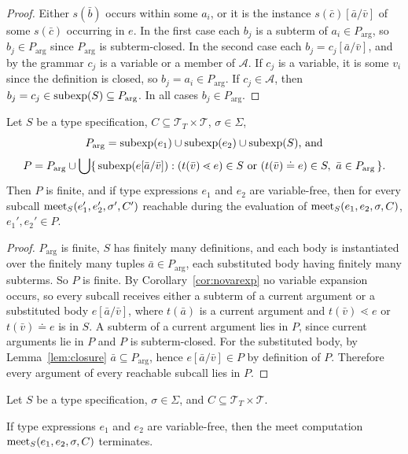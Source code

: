 \documentclass[doc]{subfiles}
\begin{document}
\begin{proof}
	Either $s(\bar b)$ occurs within some $a_i$, or it is the instance $s(\bar c)[\bar a/\bar v]$
	of some $s(\bar c)$ occurring in $e$.
	In the first case each $b_j$ is a subterm of $a_i \in P_{\mathrm{arg}}$, so $b_j \in P_{\mathrm{arg}}$
	since $P_{\mathrm{arg}}$ is subterm-closed.
	In the second case each $b_j = c_j[\bar a/\bar v]$, and by the grammar $c_j$ is a variable or a member of $\mathcal A$.
	If $c_j$ is a variable, it is some $v_i$ since the definition is closed, so $b_j = a_i \in P_{\mathrm{arg}}$.
	If $c_j \in \mathcal A$, then $b_j = c_j \in \mathrm{subexp}(S) \subseteq P_{\mathrm{arg}}$.
	In all cases $b_j \in P_{\mathrm{arg}}$.
\end{proof}

\begin{lemma}\label{lem:vfree-pool}
	Let $S$ be a type specification, $C \subseteq \mathcal{T}_T \times \mathcal{T}$, $\sigma \in \Sigma$,
	\[
		P_{\mathrm{arg}} = \mathrm{subexp}(e_1) \cup \mathrm{subexp}(e_2) \cup \mathrm{subexp}(S)\text{, and}
	\]
	\[
		P = P_{\mathrm{arg}} \cup \bigcup \{\, \mathrm{subexp}(e[\bar a/\bar v]) :
		(t(\bar v) \lessdot e) \in S \text{ or } (t(\bar v) \doteq e) \in S,\ \bar a \in P_{\mathrm{arg}} \,\}.
	\]
	Then $P$ is finite, and if type expressions $e_1$ and $e_2$ are variable-free,
	then for every subcall $\mathrm{meet}_S(e_1',e_2',\sigma',C')$
	reachable during the evaluation of $\mathrm{meet}_S(e_1,e_2,\sigma,C)$,
	$e_1',e_2' \in P$.
\end{lemma}

\begin{proof}
	$P_{\mathrm{arg}}$ is finite, $S$ has finitely many definitions,
	and each body is instantiated over the finitely many tuples $\bar a \in P_{\mathrm{arg}}$,
	each substituted body having finitely many subterms. So $P$ is finite.
	By Corollary~\ref{cor:novarexp} no variable expansion occurs, so every subcall receives
	either a subterm of a current argument or a substituted body $e[\bar a/\bar v]$,
	where $t(\bar a)$ is a current argument and $t(\bar v) \lessdot e$ or $t(\bar v) \doteq e$ is in $S$.
	A subterm of a current argument lies in $P$, since current arguments lie in $P$ and $P$ is subterm-closed.
	For the substituted body, by Lemma~\ref{lem:closure} $\bar a \subseteq P_{\mathrm{arg}}$,
	hence $e[\bar a/\bar v] \in P$ by definition of $P$.
	Therefore every argument of every reachable subcall lies in $P$.
\end{proof}

\begin{lemma}\label{lem:vfree-term}
	Let $S$ be a type specification,
	$\sigma \in \Sigma$,
	and $C \subseteq \mathcal{T}_T \times \mathcal{T}$.

	If type expressions $e_1$ and $e_2$ are variable-free,
	then the meet computation $\mathrm{meet}_S(e_1,e_2,\sigma,C)$ terminates.
\end{lemma}
\end{document}
